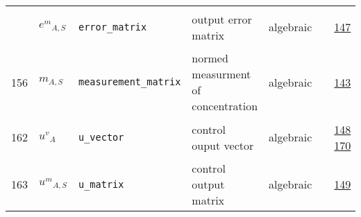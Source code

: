 \begin{longtable}{|p{1cm}|p{2.5cm}|p{4.5cm}|p{8cm}|p{3.0cm}|p{3cm}|p{1cm}|}
             & \hypertarget{"v:161"}{ $ {{e^{m}}}{_{A, S}} $}
             & \verb|error_matrix|
             & output error matrix
             & \begin{lay}algebraic \end{lay}
             & $  $
             &                 \hyperlink{"e:147"}{ 147 }
                 \\
            156
             & \hypertarget{"v:156"}{ $ {m}{_{A, S}} $}
             & \verb|measurement_matrix|
             & normed measurment of concentration
             & \begin{lay}algebraic \end{lay}
             & $  $
             &                 \hyperlink{"e:143"}{ 143 }
                 \\
            162
             & \hypertarget{"v:162"}{ $ {{u^{v}}}{_{A}} $}
             & \verb|u_vector|
             & control ouput vector
             & \begin{lay}algebraic \end{lay}
             & $  $
             &                 \hyperlink{"e:148"}{ 148 }
                                 \hyperlink{"e:170"}{ 170 }
                 \\
            163
             & \hypertarget{"v:163"}{ $ {{u^{m}}}{_{A, S}} $}
             & \verb|u_matrix|
             & control output matrix
             & \begin{lay}algebraic \end{lay}
             & $  $
             &                 \hyperlink{"e:149"}{ 149 }
                 \\
    \end{longtable}